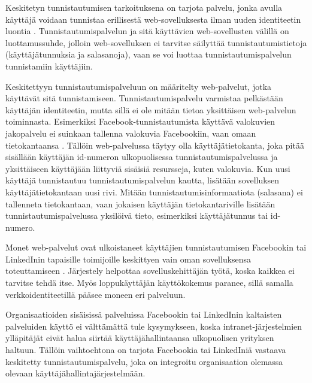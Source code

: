 Keskitetyn tunnistautumisen tarkoituksena on tarjota palvelu, jonka avulla käyttäjä voidaan tunnistaa erillisestä web-sovelluksesta ilman uuden identiteetin luontia \cite{facebook}. Tunnistautumispalvelun ja sitä käyttävien web-sovellusten välillä on luottamussuhde, jolloin web-sovelluksen ei tarvitse säilyttää tunnistautumistietoja (käyttäjätunnuksia ja salasanoja), vaan se voi luottaa tunnistautumispalvelun tunnistamiin käyttäjiin.

Keskitettyyn tunnistautumispalveluun on määritelty web-palvelut, jotka käyttävät sitä tunnistamiseen. Tunnistautumispalvelu varmistaa pelkästään käyttäjän identiteetin, mutta sillä ei ole mitään tietoa yksittäisen web-palvelun toiminnasta. Esimerkiksi Facebook-tunnistautumista käyttävä valokuvien jakopalvelu ei suinkaan tallenna valokuvia Facebookiin, vaan omaan tietokantaansa \cite{web_resources}. Tällöin web-palvelussa täytyy olla käyttäjätietokanta, joka pitää sisällään käyttäjän id-numeron ulkopuolisessa tunnistautumispalvelussa ja yksittäiseen käyttäjään liittyviä sisäisiä resursseja, kuten valokuvia. Kun uusi käyttäjä tunnistautuu tunnistautumispalvelun kautta, lisätään sovelluksen käyttäjätietokantaan uusi rivi. Mitään tunnistautumisinformaatiota (salasana) ei tallenneta tietokantaan, vaan jokaisen käyttäjän tietokantariville lisätään tunnistautumispalvelussa yksilöivä tieto, esimerkiksi käyttäjätunnus tai id-numero.

Monet web-palvelut ovat ulkoistaneet käyttäjien tunnistautumisen Facebookin tai LinkedInin tapaisille toimijoille keskittyen vain oman sovelluksensa toteuttamiseen \cite{facebook}. Järjestely helpottaa sovelluskehittäjän työtä, koska kaikkea ei tarvitse tehdä itse. Myös loppukäyttäjän käyttökokemus paranee, sillä samalla verkkoidentiteetillä pääsee moneen eri palveluun.

Organisaatioiden sisäisissä palveluissa Facebookin tai LinkedInin kaltaisten palveluiden käyttö ei välttämättä tule kysymykseen, koska intranet-järjestelmien ylläpitäjät eivät halua siirtää käyttäjähallintaansa ulkopuolisen yrityksen haltuun. Tällöin vaihtoehtona on tarjota Facebookia tai LinkedIniä vastaava keskitetty tunnistautumispalvelu, joka on integroitu organisaation olemassa olevaan käyttäjähallintajärjestelmään.